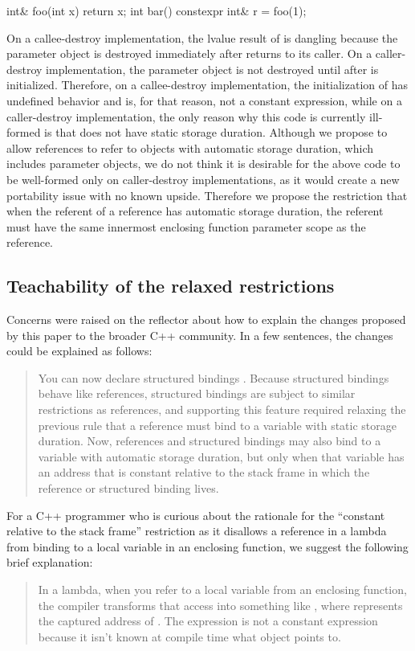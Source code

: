 \documentclass{wg21}
\begin{document}
\begin{colorblock}
int& foo(int x) { return x; }
int bar() {
    constexpr int& r = foo(1);
}
\end{colorblock}

On a callee-destroy implementation, the lvalue result of  is
dangling because the parameter object  is destroyed immediately after
 returns to its caller. On a caller-destroy implementation, the
parameter object  is not destroyed until after  is
initialized. Therefore, on a callee-destroy implementation, the initialization
of  has undefined behavior and is, for that reason, not a constant
expression, while on a caller-destroy implementation, the only reason why this
code is currently ill-formed is that  does not have static
storage duration. Although we propose to allow  references to
refer to objects with automatic storage duration, which includes parameter
objects, we do not think it is desirable for the above code to be well-formed
only on caller-destroy implementations, as it would create a new portability
issue with no known upside. Therefore we propose the restriction that when the
referent of a  reference has automatic storage duration, the
referent must have the same innermost enclosing function parameter scope as the
reference.

\subsection{Teachability of the relaxed restrictions}
Concerns were raised on the reflector about how to explain the changes proposed
by this paper to the broader C++ community. In a few sentences, the changes
could be explained as follows:
\begin{quote}
You can now declare structured bindings . Because structured
bindings behave like references,  structured bindings are
subject to similar restrictions as  references, and supporting
this feature required relaxing the previous rule that a 
reference must bind to a variable with static storage duration. Now,
 references and structured bindings may also bind to a
variable with automatic storage duration, but only when that variable has an
address that is constant relative to the stack frame in which the reference or
structured binding lives.
\end{quote}
For a C++ programmer who is curious about the rationale for the ``constant
relative to the stack frame'' restriction as it disallows a 
reference in a lambda from binding to a local variable in an enclosing
function, we suggest the following brief explanation:
\begin{quote}
In a lambda, when you refer to a local variable  from an enclosing
function, the compiler transforms that access into something like
, where  represents the captured address of
. The expression  is not a constant expression
because it isn't known at compile time what object  points to.
\end{quote}
\end{document}
